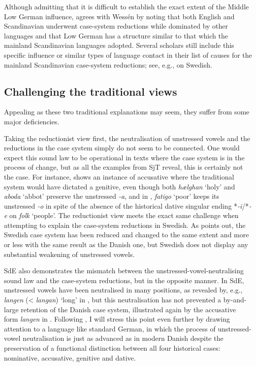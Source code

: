 \documentclass[output=paper]{langsci/langscibook}
\begin{document}
Although admitting that it is difficult to establish the exact extent of the Middle Low German influence, \citet[65]{Haugen1976} agrees with Wessén by noting that both English and Scandinavian underwent case-system reductions while dominated by other languages and that Low German has a structure similar to that which the mainland Scandinavian languages adopted. Several scholars still include this specific influence or similar types of language contact in their list of causes for the mainland Scandinavian case-system reductions; see, e.g., \citet[243]{Norde2001} on Swedish.

\subsection{Challenging the traditional views} \label{hansen:3.2}

Appealing as these two traditional explanations may seem, they suffer from some major deficiencies.

Taking the reductionist view first, the neutralisation of unstressed vowels and the reductions in the case system simply do not seem to be connected. One would expect this sound law to be operational in texts where the case system is in the process of change, but as all the examples from SjT reveal, this is certainly not the case. For instance,  shows an instance of accusative where the traditional system would have dictated a genitive, even though both \textit{hælghan} ‘holy’ and \textit{aboda} ‘abbot’ preserve the unstressed \textit{{}-a}, and in , \textit{fatigo} ‘poor’ keeps its unstressed \textit{{}-o} in spite of the absence of the historical dative singular ending *\textit{{}-i}/*\textit{{}-e} on \textit{folk} ‘people’. The reductionist view meets the exact same challenge when attempting to explain the case-system reductions in Swedish. As \citet[18]{Jensen2011} points out, the Swedish case system has been reduced and changed to the same extent and more or less with the same result as the Danish one, but Swedish does not display any substantial weakening of unstressed vowels.

SdE also demonstrates the mismatch between the unstressed-vowel-neu\-tral\-ising sound law and the case-system reductions, but in the opposite manner. In SdE, unstressed vowels have been neutralised in many positions, as revealed by, e.g., \textit{langen} (< \textit{langan}) ‘long’ in , but this neutralisation has not prevented a by-and-large retention of the Danish case system, illustrated again by the accusative form \textit{langen} in . Following \citet[4--5]{BaechlerBaechler2018}, I will stress this point even further by drawing attention to a language like standard German, in which the process of unstressed-vowel neutralisation is just as advanced as in modern Danish despite the preservation of a functional distinction between all four historical cases: nominative, accusative, genitive and dative.
\end{document}
